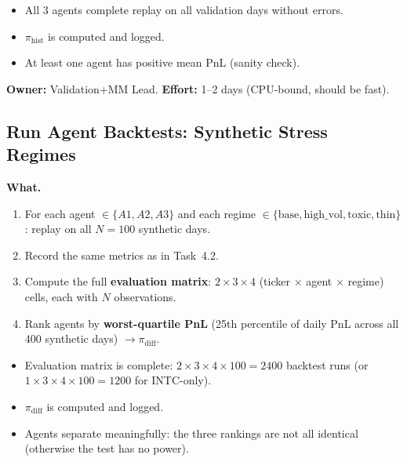 \documentclass[11pt,a4paper]{article}
\begin{document}
\begin{successbox}
  \begin{itemize}[nosep]
    \item All 3 agents complete replay on all validation days without errors.
    \item $\pi_{\text{hist}}$ is computed and logged.
    \item At least one agent has positive mean PnL (sanity check).
  \end{itemize}
\end{successbox}

\textbf{Owner:} Validation+MM Lead. \quad \textbf{Effort:} 1--2 days (CPU-bound, should be fast).

\subsection{Run Agent Backtests: Synthetic Stress Regimes}

\textbf{What.}
\begin{enumerate}[nosep]
  \item For each agent $\in \{A1, A2, A3\}$ and each regime $\in \{\text{base}, \text{high\_vol}, \text{toxic}, \text{thin}\}$: replay on all $N = 100$ synthetic days.
  \item Record the same metrics as in Task~4.2.
  \item Compute the full \textbf{evaluation matrix}: $2 \times 3 \times 4$ (ticker $\times$ agent $\times$ regime) cells, each with $N$ observations.
  \item Rank agents by \textbf{worst-quartile PnL} (25th percentile of daily PnL across all 400 synthetic days) $\to \pi_{\text{diff}}$.
\end{enumerate}

\begin{successbox}
  \begin{itemize}[nosep]
    \item Evaluation matrix is complete: $2 \times 3 \times 4 \times 100 = 2400$ backtest runs (or $1 \times 3 \times 4 \times 100 = 1200$ for INTC-only).
    \item $\pi_{\text{diff}}$ is computed and logged.
    \item Agents separate meaningfully: the three rankings are not all identical (otherwise the test has no power).
  \end{itemize}
\end{successbox}
\end{document}
